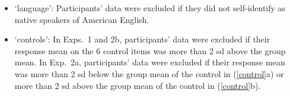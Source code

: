 \documentclass[11pt,fleqn]{article}
\newcommand{\6}{\mbox{$[\hspace*{-.6mm}[$}}
\newcommand{\9}{\mbox{$]\hspace*{-.6mm}]$}}
\newcommand{\jt}[1]{\textbf{\color{blue}JT: #1}}
\begin{document}
\begin{itemize}[topsep = -1ex,itemsep=-2pt]


\item `language': Participants' data were excluded if they did not self-identify as native speakers of American English.

\item `controls': In Exps.~1 and 2b, participants' data were excluded if their response mean on the 6 control items was more than 2 sd above the group mean. In Exp.~2a, participants' data were excluded if their response mean was more than 2 sd below the group mean of the control in (\ref{control}a) or more than 2 sd above the group mean of the control in (\ref{control}b).


\end{itemize}


\end{document}
